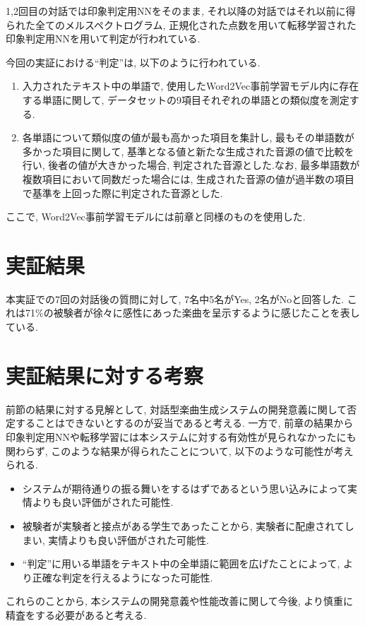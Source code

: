 \documentclass[a4paper,11pt,dvipdfmx]{jreport}
\begin{document}
1,2回目の対話では印象判定用NNをそのまま, それ以降の対話ではそれ以前に得られた全てのメルスペクトログラム, 正規化された点数を用いて転移学習された印象判定用NNを用いて判定が行われている.

今回の実証における``判定''は, 以下のように行われている.
\begin{enumerate}
  \item 入力されたテキスト中の単語で, 使用したWord2Vec事前学習モデル内に存在する単語に関して, 
        データセットの9項目それぞれの単語との類似度を測定する.
  \item 各単語について類似度の値が最も高かった項目を集計し, 
        最もその単語数が多かった項目に関して, 
        基準となる値と新たな生成された音源の値で比較を行い, 後者の値が大きかった場合, 
        判定された音源とした.なお, 最多単語数が複数項目において同数だった場合には, 生成された音源の値が過半数の項目で基準を上回った際に判定された音源とした.
\end{enumerate}
ここで, Word2Vec事前学習モデルには前章と同様のものを使用した.

\section{実証結果}
本実証での7回の対話後の質問に対して, 7名中5名がYes, 2名がNoと回答した.
これは71\%の被験者が徐々に感性にあった楽曲を呈示するように感じたことを表している.

\section{実証結果に対する考察}
前節の結果に対する見解として, 対話型楽曲生成システムの開発意義に関して否定することはできないとするのが妥当であると考える.
一方で, 前章の結果から印象判定用NNや転移学習には本システムに対する有効性が見られなかったにも関わらず, このような結果が得られたことについて, 以下のような可能性が考えられる.
\begin{itemize}
  \item システムが期待通りの振る舞いをするはずであるという思い込みによって実情よりも良い評価がされた可能性.
  \item 被験者が実験者と接点がある学生であったことから, 実験者に配慮されてしまい, 実情よりも良い評価がされた可能性.
  \item ``判定''に用いる単語をテキスト中の全単語に範囲を広げたことによって, より正確な判定を行えるようになった可能性.
\end{itemize}
これらのことから, 本システムの開発意義や性能改善に関して今後, より慎重に精査をする必要があると考える.
\end{document}
